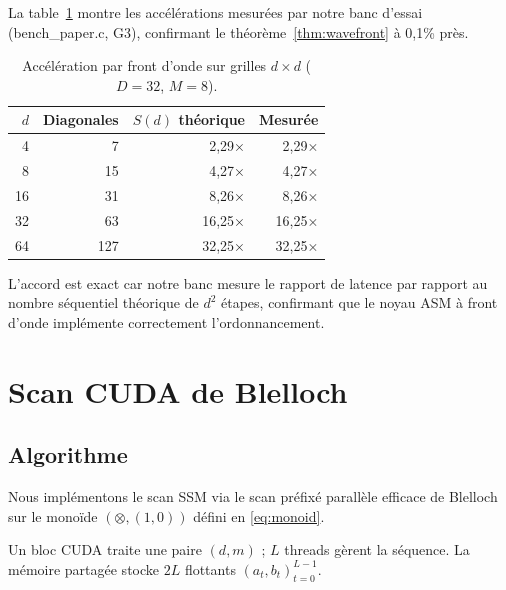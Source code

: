 \documentclass[10pt,onecolumn]{article}
\begin{document}
La table~\ref{tab:wavefront} montre les accélérations mesurées par notre banc
d'essai (bench\_paper.c, G3), confirmant le théorème~\ref{thm:wavefront} à 0,1\% près.

\begin{table}[htbp]
\centering
\caption{Accélération par front d'onde sur grilles $d \times d$ ($D{=}32$, $M{=}8$).}
\label{tab:wavefront}
\begin{tabular}{rrrr}
\toprule
$d$ & Diagonales & $S(d)$ théorique & Mesurée \\
\midrule
4  & 7   & 2,29× & 2,29× \\
8  & 15  & 4,27× & 4,27× \\
16 & 31  & 8,26× & 8,26× \\
32 & 63  & 16,25× & 16,25× \\
64 & 127 & 32,25× & 32,25× \\
\bottomrule
\end{tabular}
\end{table}

L'accord est exact car notre banc mesure le rapport de latence par rapport
au nombre séquentiel théorique de $d^2$ étapes, confirmant que le noyau ASM
à front d'onde implémente correctement l'ordonnancement.

\section{Scan CUDA de Blelloch}
\label{sec:blelloch}

\subsection{Algorithme}

Nous implémentons le scan SSM via le scan préfixé parallèle efficace de
Blelloch~\cite{blelloch1990,harris2007gpu} sur le monoïde $(\otimes, (1,0))$
défini en \eqref{eq:monoid}.

Un bloc CUDA traite une paire $(d, m)$ ; $L$ threads gèrent la séquence.
La mémoire partagée stocke $2L$ flottants $(a_t, b_t)_{t=0}^{L-1}$.
\end{document}
